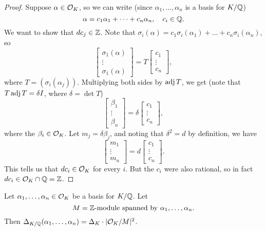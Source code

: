 \begin{proof}
  Suppose $\alpha \in \mathcal{O}_K$, so we can write
  (since $\alpha_1, \dots, \alpha_n$ is a basis for
  $K / \mathbb{Q}$)
  \[
    \alpha = c_1 \alpha_1 + \dots + c_n \alpha_n,
    \quad c_i \in \mathbb{Q}.
  \]
  We want to show that $d c_j \in \mathbb{Z}$. Note that
  $\sigma_i(\alpha) = c_1 \sigma_i(\alpha_1) + \dots + c_n \sigma_i(\alpha_n)$, so
  \[
    \begin{bmatrix}
      \sigma_1(\alpha) \\ \vdots \\ \sigma_1(\alpha)
    \end{bmatrix}
    = T
    \begin{bmatrix}
      c_1 \\ \vdots \\ c_n
    \end{bmatrix},
  \]
  where $T = (\sigma_i(\alpha_j))$. Multiplying
  both sides by $\operatorname{adj} T$, we get
  (note that $T \operatorname{adj} T = \delta I$, where $\delta = \det T$)
  \[
    \begin{bmatrix}
      \beta_1 \\ \vdots \\ \beta_n
    \end{bmatrix}
    = \delta
    \begin{bmatrix}
      c_1 \\ \vdots \\ c_n
    \end{bmatrix},
  \]
  where the $\beta_i \in \mathcal{O}_K$. Let
  $m_j = \delta \beta_j$, and noting that $\delta^2 = d$
  by definition, we have
  \[
    \begin{bmatrix}
      m_1 \\ \vdots \\ m_n
    \end{bmatrix} = d
    \begin{bmatrix}
      c_1 \\ \vdots \\ c_n
    \end{bmatrix}.
  \]
  This tells us that $d c_i \in \mathcal{O}_K$ for every $i$.
  But the $c_i$ were also rational, so in fact
  $d c_i \in \mathcal{O}_K \cap \mathbb{Q} = \mathbb{Z}$.
\end{proof}

\begin{lemma}
  Let $\alpha_1, \dots, \alpha_n \in \mathcal{O}_K$ be a basis
  for $K / \mathbb{Q}$. Let
  \[
    M = \text{$\mathbb{Z}$-module spanned by $\alpha_1, \dots, \alpha_n$}.
  \]
  Then $\Delta_{K / \mathbb{Q}}(\alpha_1, \dots, \alpha_n) = \Delta_K \cdot |\mathcal{O}_K / M|^2$.
\end{lemma}

